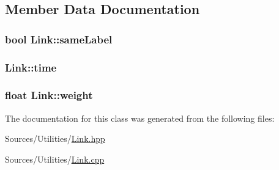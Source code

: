 \subsection{Member Data Documentation}
\hypertarget{class_link_ae5f10e1961b948c4a5e71e6702c68de0}{
\subsubsection[{same\+Label}]{\setlength{\rightskip}{0pt plus 5cm}bool Link\+::same\+Label\hspace{0.3cm}{\ttfamily [private]}}}\label{class_link_ae5f10e1961b948c4a5e71e6702c68de0}
\hypertarget{class_link_acb992140e3cf154c36fd94ab8184e00e}{
\subsubsection[{time}]{ Link\+::time\hspace{0.3cm}{\ttfamily [private]}}}\label{class_link_acb992140e3cf154c36fd94ab8184e00e}
\hypertarget{class_link_a61f8b4a76aa028011dbe75affc1b44f7}{
\subsubsection[{weight}]{\setlength{\rightskip}{0pt plus 5cm}float Link\+::weight\hspace{0.3cm}{\ttfamily [private]}}}\label{class_link_a61f8b4a76aa028011dbe75affc1b44f7}


The documentation for this class was generated from the following files\+:\begin{DoxyCompactItemize}
\item 
Sources/\+Utilities/\hyperlink{_link_8hpp}{Link.\+hpp}\item 
Sources/\+Utilities/\hyperlink{_link_8cpp}{Link.\+cpp}\end{DoxyCompactItemize}
